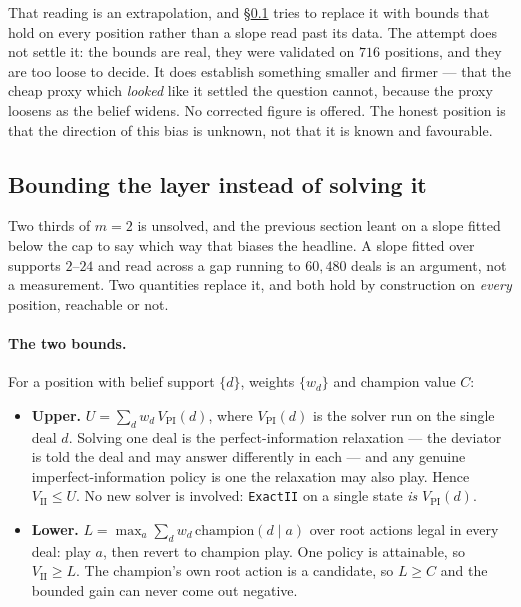 \documentclass[11pt,a4paper]{article}
\begin{document}
That reading is an extrapolation, and \S\ref{sec:iibounds} tries to replace it
with bounds that hold on every position rather than a slope read past its data.
The attempt does not settle it: the bounds are real, they were validated on
$716$ positions, and they are too loose to decide. It does establish something
smaller and firmer --- that the cheap proxy which \emph{looked} like it settled
the question cannot, because the proxy loosens as the belief widens. No
corrected figure is offered. The honest position is that the direction of this
bias is unknown, not that it is known and favourable.

\subsection{Bounding the layer instead of solving it}
\label{sec:iibounds}

Two thirds of $m = 2$ is unsolved, and the previous section leant on a slope
fitted below the cap to say which way that biases the headline. A slope
fitted over supports $2$--$24$ and read across a gap running to $60{,}480$
deals is an argument, not a measurement. Two quantities replace it, and both
hold by construction on \emph{every} position, reachable or not.

\paragraph{The two bounds.} For a position with belief support $\{d\}$,
weights $\{w_d\}$ and champion value $C$:

\begin{itemize}
\item \textbf{Upper.} $U = \sum_d w_d\,V_{\mathrm{PI}}(d)$, where
  $V_{\mathrm{PI}}(d)$ is the solver run on the single deal $d$. Solving one
  deal is the perfect-information relaxation --- the deviator is told the deal
  and may answer differently in each --- and any genuine
  imperfect-information policy is one the relaxation may also play. Hence
  $V_{\mathrm{II}} \le U$. No new solver is involved: \texttt{ExactII} on a
  single state \emph{is} $V_{\mathrm{PI}}(d)$.
\item \textbf{Lower.} $L = \max_a \sum_d w_d\,\mathrm{champion}(d \mid a)$
  over root actions legal in every deal: play $a$, then revert to champion
  play. One policy is attainable, so $V_{\mathrm{II}} \ge L$. The champion's
  own root action is a candidate, so $L \ge C$ and the bounded gain can never
  come out negative.
\end{itemize}
\end{document}
